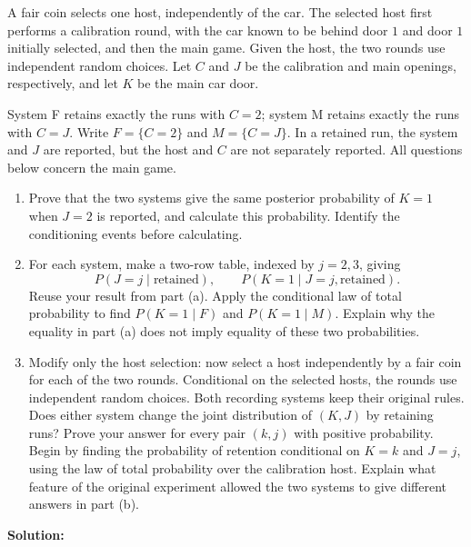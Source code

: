 \documentclass[11pt,a4paper]{article}
\newcommand{\Prob}{P}
\begin{document}
A fair coin selects one host, independently of the car. The selected host
first performs a calibration round, with the car known to be behind door
$1$ and door $1$ initially selected, and then the main game. Given the host, the two rounds use independent
random choices. Let $C$ and $J$ be the calibration and main openings,
respectively, and let $K$ be the main car door.

System F retains exactly the runs with $C=2$; system M retains exactly
the runs with $C=J$. Write $F=\{C=2\}$ and $M=\{C=J\}$. In a retained
run, the system and $J$ are reported, but the host and $C$ are not
separately reported. All questions below concern the main game.

\begin{enumerate}
\item Prove that the two systems give the same
posterior probability of $K=1$ when $J=2$ is reported, and calculate
this probability. Identify the conditioning events before calculating.

\item For each system, make a two-row table, indexed
by $j=2,3$, giving
\[
\Prob(J=j\mid\text{retained}),\qquad
\Prob(K=1\mid J=j,\text{retained}).
\]
Reuse your result from part (a). Apply the conditional law of total
probability to find \mbox{$\Prob(K=1\mid F)$} and \mbox{$\Prob(K=1\mid M)$}.
Explain why the equality in part (a) does not imply equality of these
two probabilities.

\item Modify only the host selection: now select a
host independently by a fair coin for each of the two rounds. Conditional on the selected hosts, the rounds use independent random choices. Both
recording systems keep their original rules. Does either system change
the joint distribution of $(K,J)$ by retaining runs? Prove your answer
for every pair $(k,j)$ with positive probability. Begin by finding the
probability of retention conditional on $K=k$ and $J=j$, using the law of
total probability over the calibration host. Explain what feature of
the original experiment allowed the two systems to give different
answers in part (b).
\end{enumerate}

\textbf{Solution:}
\end{document}
